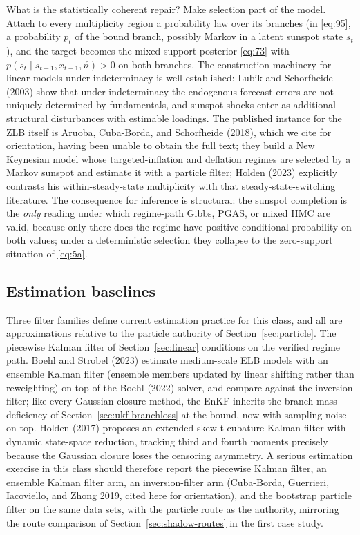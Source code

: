 \documentclass[11pt]{article}
\begin{document}
What is the statistically coherent repair? Make selection part of the model.
Attach to every multiplicity region a probability law over its branches
(in \eqref{eq:95}, a probability $p_t$ of the bound branch, possibly Markov in
a latent sunspot state $s_t$), and the target becomes the mixed-support
posterior \eqref{eq:73} with $p(s_t\mid s_{t-1},x_{t-1},\vartheta)>0$ on both
branches. The construction machinery for linear models under indeterminacy is
well established: Lubik and Schorfheide (2003) show that under indeterminacy
the endogenous forecast errors are not uniquely determined by fundamentals,
and sunspot shocks enter as additional structural disturbances with estimable
loadings. The published instance for the ZLB itself is Aruoba, Cuba-Borda, and
Schorfheide (2018), which we cite for orientation, having been unable to
obtain the full text; they build a New Keynesian model whose
targeted-inflation and deflation regimes are selected by a Markov sunspot and
estimate it with a particle filter; Holden (2023) explicitly contrasts his
within-steady-state multiplicity with that steady-state-switching literature.
The consequence for inference is structural: the sunspot completion is the
\emph{only} reading under which regime-path Gibbs, PGAS, or mixed HMC are
valid, because only there does the regime have positive conditional
probability on both values; under a deterministic selection they collapse to
the zero-support situation of \eqref{eq:5a}.

\subsection{Estimation baselines}
\label{sec:nk-baselines}

Three filter families define current estimation practice for this class, and
all are approximations relative to the particle authority of
Section~\ref{sec:particle}. The piecewise Kalman filter of Section~\ref{sec:linear} conditions
on the verified regime path. Boehl and Strobel (2023) estimate medium-scale
ELB models with an ensemble Kalman filter (ensemble members updated by
linear shifting rather than reweighting) on top of the Boehl (2022) solver,
and compare against the inversion filter; like every Gaussian-closure method,
the EnKF inherits the branch-mass deficiency of Section~\ref{sec:ukf-branchloss} at
the bound, now with sampling noise on top. Holden (2017) proposes an extended
skew-t cubature Kalman filter with dynamic state-space reduction, tracking
third and fourth moments precisely because the Gaussian closure loses the
censoring asymmetry. A serious estimation exercise in this class should
therefore report the piecewise Kalman filter, an ensemble Kalman filter arm,
an inversion-filter arm (Cuba-Borda, Guerrieri, Iacoviello, and Zhong 2019,
cited here for orientation), and the bootstrap particle filter on the same
data sets, with the particle route as the authority, mirroring the route
comparison of Section~\ref{sec:shadow-routes} in the first case study.
\end{document}
